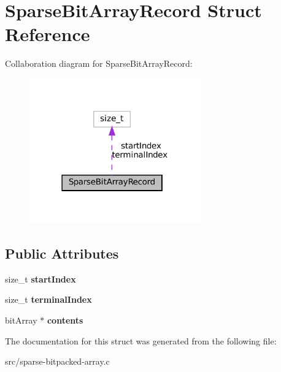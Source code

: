 \hypertarget{structSparseBitArrayRecord}{}\section{Sparse\+Bit\+Array\+Record Struct Reference}
\label{structSparseBitArrayRecord}


Collaboration diagram for Sparse\+Bit\+Array\+Record\+:\nopagebreak
\begin{figure}[H]
\begin{center}
\leavevmode
\includegraphics[width=210pt]{structSparseBitArrayRecord__coll__graph}
\end{center}
\end{figure}
\subsection*{Public Attributes}
\begin{DoxyCompactItemize}
\item 
\mbox{\label{structSparseBitArrayRecord_af86795c8dc77f6dcd1c965df9f185003}} 
size\+\_\+t {\bfseries start\+Index}
\item 
\mbox{\label{structSparseBitArrayRecord_a8b8a6007b9e20eba983e8a86840ae344}} 
size\+\_\+t {\bfseries terminal\+Index}
\item 
\mbox{\label{structSparseBitArrayRecord_aa7ff29c1e49eb345e7b66debf57a99a5}} 
bit\+Array $\ast$ {\bfseries contents}
\end{DoxyCompactItemize}


The documentation for this struct was generated from the following file\+:\begin{DoxyCompactItemize}
\item 
src/sparse-\/bitpacked-\/array.\+c\end{DoxyCompactItemize}
